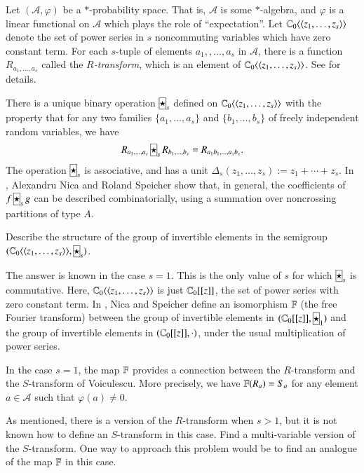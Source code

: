 \documentclass[12pt,letterpaper, reqno]{aimpl}
\newcommand{\A}{\mathcal A}
\newcommand{\freestar}{ \framebox[7pt]{$\star$} }
\begin{document}
\begin{problemblock}
Let $(\A,\varphi)$ be a $*$-probability space. That is, $\A$ is some $*$-algebra, and $\varphi$ is a linear functional on $\A$ which plays the role of ``expectation''. Let $\mathbb C_0\langle\langle z_1,\ldots,z_s\rangle\rangle$ denote the set of power series in $s$ noncommuting variables which have zero constant term. For each $s$-tuple of elements $a_1,,\ldots,a_s$ in $\A$, there is a function $R_{a_1,\ldots,a_s}$ called the  \emph{$R$-transform}, which is an element of $\mathbb C_0\langle\langle z_1,\ldots,z_s\rangle\rangle$. See \cite{nica-speicher:ntuples} for details.

There is a unique binary operation $\freestar_s$ defined on $\mathbb C_0\langle\langle z_1,\ldots,z_s\rangle\rangle$ with the property that for any two families $\{a_1,\ldots,a_s\}$ and $\{b_1,\ldots,b_s\}$ of freely independent random variables, we have
\begin{equation*}
R_{a_1,\ldots,a_s}\,\freestar_s\, R_{b_1,\ldots,b_s} = R_{a_1b_1,\ldots,a_sb_s}.
\end{equation*}
The operation $\freestar_s$ is associative, and has a unit $\Delta_s(z_1,\ldots,z_s):= z_1+\cdots +z_s$. In \cite{nica-speicher:ntuples}, Alexandru Nica and Roland Speicher show that, in general, the coefficients of $f\,\freestar_s \,g$ can be described combinatorially, using a summation over noncrossing partitions of type $A$.

\begin{problem}[5.2]
Describe the structure of the group of
invertible elements in the
semigroup
$( \C_0\langle\langle z_1,\ldots,z_s\rangle\rangle,\freestar_s )$.\end{problem}

\begin{remark}
The answer is known in the case $s=1$. This is the only value of $s$
for which $\freestar_s$ is commutative. Here, $\mathbb C_0\langle\langle
z_1,\ldots,z_s\rangle\rangle$ is just $\mathbb C_0[[z]]$, the set of power
series with zero constant term. In \cite{nica-speicher:fourier}, Nica and
Speicher define an isomorphism $\mathbb F$ (the free Fourier transform)
between the group of invertible elements in $(\C_0[[z]], \freestar_1)$
and the group of invertible elements in $(\mathbb C_0[[z]], \cdot)$, under the
usual multiplication of power series.
\end{remark}

\begin{remark}In the case $s=1$, the map $\mathbb F$ provides a connection between the $R$-transform and the $S$-transform of Voiculescu. More precisely, we have $\mathbb F(R_a)=S_a$ for any element $a\in\A$ such that $\varphi(a)\neq 0$.

As mentioned, there is a version of the $R$-transform when $s>1$, but it is not known how to define an $S$-transform in this case. Find a multi-variable version of the $S$-transform. One way to approach this problem would be to find an analogue of the map $\mathbb F$ in this case.
\end{remark}

\end{problemblock}
\end{document}
